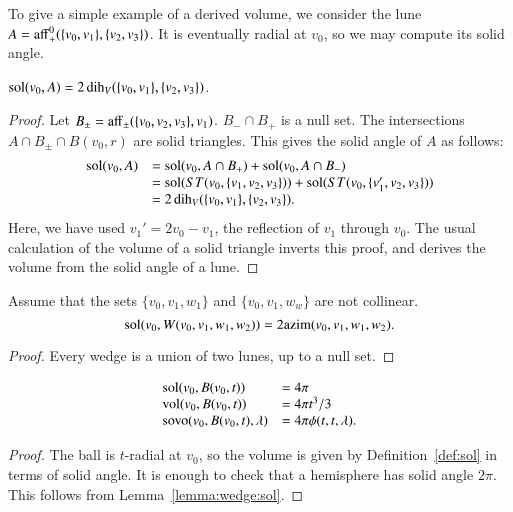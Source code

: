 To give a simple example of a derived volume, we consider the
lune $A={\operatorname{aff}}_+^0(\{v_0,v_1\},\{v_2,v_3\})$.  It is eventually
radial at $v_0$, so we may compute its solid angle.

\begin{lemma}  $\operatorname{sol}(v_0,A) = 2\operatorname{dih}_V(\{v_0,v_1\},\{v_2,v_3\})$.
\end{lemma}

\begin{proof}
Let $B_{\pm} = {\operatorname{aff}}_\pm(\{v_0,v_2,v_3\},v_1)$.  $B_- \cap B_+$
is a null set.  The intersections $A\cap B_{\pm}\cap B(v_0,r)$ 
are solid triangles.  This gives the solid angle of $A$ as
follows:
   $$\begin{array}{lll}
   \operatorname{sol}(v_0,A) &= \operatorname{sol}(v_0,A\cap B_+)+\operatorname{sol}(v_0,A\cap B_-) \\
   &= 
   \operatorname{sol}(ST(v_0,\{v_1,v_2,v_3\})) + \operatorname{sol}(ST(v_0,\{v_1',v_2,v_3\})) \\
   &=
   2\operatorname{dih}_V(\{v_0,v_1\},\{v_2,v_3\}).
   \end{array}
   $$
Here, we have used $v_1'= 2 v_0 - v_1$, the reflection of $v_1$
through $v_0$.  The usual calculation of the volume of a solid triangle
inverts this proof, 
and derives the volume from the solid angle of a lune.
\end{proof}



\begin{lemma} 
Assume that the sets $\{v_0,v_1,w_1\}$ and
$\{v_0,v_1,w_w\}$ are not collinear. 
$$\operatorname{sol}(v_0,W(v_0,v_1,w_1,w_2)) = 2{\operatorname{azim}}(v_0,v_1,w_1,w_2).$$
\end{lemma}    

\begin{proof} Every wedge is a union of two lunes, up to a null set.
\end{proof}

\begin{lemma}  
   $$
   \begin{array}{lll}
    {\operatorname{sol}}(v_0,B(v_0,t)) &= 4\pi\\
    {\operatorname{vol}}(v_0,B(v_0,t)) &= 4\pi t^3/3\\
    {\operatorname{sovo}}(v_0,B(v_0,t),\lambda) &= 4 \pi \phi(t,t,\lambda).
   \end{array}
   $$
\end{lemma}

\begin{proof}
The ball is $t$-radial at $v_0$, so the volume is given by
Definition~\ref{def:sol} in terms of solid angle.  It is enough
to check that a hemisphere has solid angle $2\pi$.  This follows
from Lemma~\ref{lemma:wedge:sol}.
\end{proof}  




